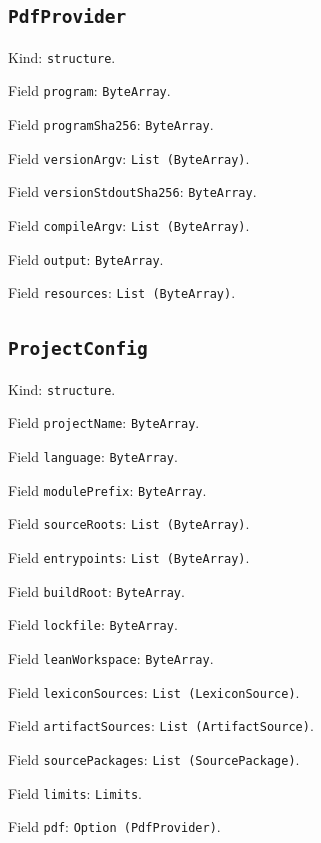 \documentclass[11pt]{article}
\begin{document}
\subsection*{\texttt{PdfProvider}}
\noindent Kind: \texttt{structure}.\par
\noindent Field \texttt{program}: \texttt{ByteArray}.\par
\noindent Field \texttt{programSha256}: \texttt{ByteArray}.\par
\noindent Field \texttt{versionArgv}: \texttt{List (ByteArray)}.\par
\noindent Field \texttt{versionStdoutSha256}: \texttt{ByteArray}.\par
\noindent Field \texttt{compileArgv}: \texttt{List (ByteArray)}.\par
\noindent Field \texttt{output}: \texttt{ByteArray}.\par
\noindent Field \texttt{resources}: \texttt{List (ByteArray)}.\par
\subsection*{\texttt{ProjectConfig}}
\noindent Kind: \texttt{structure}.\par
\noindent Field \texttt{projectName}: \texttt{ByteArray}.\par
\noindent Field \texttt{language}: \texttt{ByteArray}.\par
\noindent Field \texttt{modulePrefix}: \texttt{ByteArray}.\par
\noindent Field \texttt{sourceRoots}: \texttt{List (ByteArray)}.\par
\noindent Field \texttt{entrypoints}: \texttt{List (ByteArray)}.\par
\noindent Field \texttt{buildRoot}: \texttt{ByteArray}.\par
\noindent Field \texttt{lockfile}: \texttt{ByteArray}.\par
\noindent Field \texttt{leanWorkspace}: \texttt{ByteArray}.\par
\noindent Field \texttt{lexiconSources}: \texttt{List (LexiconSource)}.\par
\noindent Field \texttt{artifactSources}: \texttt{List (ArtifactSource)}.\par
\noindent Field \texttt{sourcePackages}: \texttt{List (SourcePackage)}.\par
\noindent Field \texttt{limits}: \texttt{Limits}.\par
\noindent Field \texttt{pdf}: \texttt{Option (PdfProvider)}.\par
\end{document}

